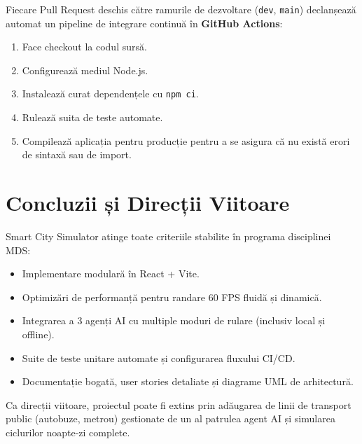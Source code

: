 \documentclass[12pt,a4paper]{article}
\begin{document}
Fiecare Pull Request deschis către ramurile de dezvoltare (\texttt{dev}, \texttt{main}) declanșează automat un pipeline de integrare continuă în \textbf{GitHub Actions}:
\begin{enumerate}
    \item Face checkout la codul sursă.
    \item Configurează mediul Node.js.
    \item Instalează curat dependențele cu \texttt{npm ci}.
    \item Rulează suita de teste automate.
    \item Compilează aplicația pentru producție pentru a se asigura că nu există erori de sintaxă sau de import.
\end{enumerate}

\section{Concluzii și Direcții Viitoare}
Smart City Simulator atinge toate criteriile stabilite în programa disciplinei MDS:
\begin{itemize}
    \item Implementare modulară în React + Vite.
    \item Optimizări de performanță pentru randare 60 FPS fluidă și dinamică.
    \item Integrarea a 3 agenți AI cu multiple moduri de rulare (inclusiv local și offline).
    \item Suite de teste unitare automate și configurarea fluxului CI/CD.
    \item Documentație bogată, user stories detaliate și diagrame UML de arhitectură.
\end{itemize}
Ca direcții viitoare, proiectul poate fi extins prin adăugarea de linii de transport public (autobuze, metrou) gestionate de un al patrulea agent AI și simularea ciclurilor noapte-zi complete.
\end{document}
